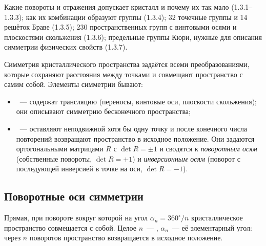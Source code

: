 \begin{orientir}
Какие повороты и отражения допускает кристалл и почему их так мало
(1.3.1--1.3.3); как их комбинации образуют группы (1.3.4); 32 точечные
группы и 14 решёток Браве (1.3.5); 230 пространственных групп с винтовыми
осями и плоскостями скольжения (1.3.6); предельные группы Кюри, нужные
для описания симметрии физических свойств (1.3.7).
\end{orientir}

Симметрия кристаллического пространства задаётся всеми
преобразованиями, которые сохраняют расстояния между точками и
совмещают пространство с самим собой. Элементы симметрии бывают:
\begin{itemize}
\item {}~— содержат трансляцию (переносы, винтовые оси,
плоскости скольжения); они описывают симметрию бесконечного
пространства;
\item {}~— оставляют неподвижной хотя бы одну точку и после
конечного числа повторений возвращают пространство в исходное
положение. Они задаются ортогональными матрицами $R$ с $\det R=\pm1$ и
сводятся к \emph{поворотным осям} (собственные повороты, $\det R=+1$) и
\emph{инверсионным осям} (поворот с последующей инверсией в точке на оси,
$\det R=-1$).
\end{itemize}

\subsection{Поворотные оси симметрии}\label{ssec:rot-axes}

\begin{opredelenie}
Прямая, при повороте вокруг которой на угол $\alpha_n=360^\circ/n$
кристаллическое пространство совмещается с собой. Целое $n$~—
, $\alpha_n$~— её элементарный угол: через $n$ поворотов
пространство возвращается в исходное положение.
\end{opredelenie}

